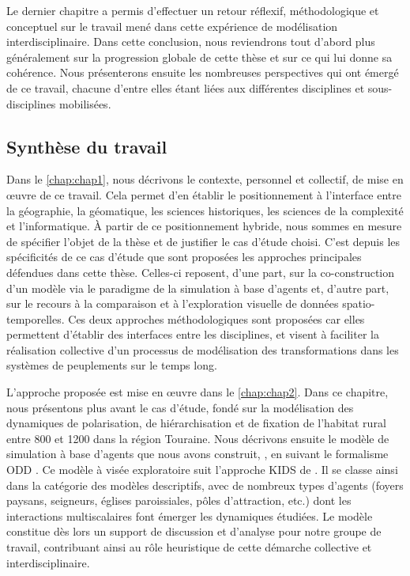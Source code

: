 Le dernier chapitre a permis d'effectuer un retour réflexif, méthodologique et conceptuel sur le travail mené dans cette expérience de modélisation interdisciplinaire.
Dans cette conclusion, nous reviendrons tout d'abord plus généralement sur la progression globale de cette thèse et sur ce qui lui donne sa cohérence.
Nous présenterons ensuite les nombreuses perspectives qui ont émergé de ce travail, chacune d'entre elles étant liées aux différentes disciplines et sous-disciplines mobilisées.


\subsection*{Synthèse du travail}

Dans le \cref{chap:chap1}, nous décrivons le contexte, personnel et collectif, de mise en œuvre de ce travail.
Cela permet d'en établir le positionnement à l'interface entre la géographie, la géomatique, les sciences historiques, les sciences de la complexité et l'informatique.
À partir de ce positionnement hybride, nous sommes en mesure de spécifier l'objet de la thèse et de justifier le cas d'étude choisi. C'est depuis les spécificités de ce cas d'étude que sont proposées les approches principales défendues dans cette thèse.
Celles-ci reposent, d'une part, sur la co-construction d'un modèle via le paradigme de la simulation à base d'agents et, d'autre part, sur le recours à la comparaison et à l'exploration visuelle de données spatio-temporelles.
Ces deux approches méthodologiques sont proposées car elles permettent d'établir des interfaces entre les disciplines, et visent à faciliter la réalisation collective d'un processus de modélisation des transformations dans les systèmes de peuplements sur le temps long. 

L'approche proposée est mise en œuvre dans le \cref{chap:chap2}.
Dans ce chapitre, nous présentons plus avant le cas d'étude, fondé sur la modélisation des dynamiques de polarisation, de hiérarchisation et de fixation de l'habitat rural entre 800 et 1200 dans la région Touraine.
Nous décrivons ensuite le modèle de simulation à base d'agents que nous avons construit, \simfeodal{}, en suivant le formalisme ODD \autocite{grimm_odd_2010}.
Ce modèle à visée exploratoire suit l'approche KIDS de \textcite{edmonds_kiss_2005}.
Il se classe ainsi dans la catégorie des modèles descriptifs, avec de nombreux types d'agents (foyers paysans, seigneurs, églises paroissiales, pôles d'attraction, etc.) dont les interactions multiscalaires font émerger les dynamiques étudiées.
Le modèle \simfeodal{} constitue dès lors un support de discussion et d'analyse pour notre groupe de travail, contribuant ainsi au rôle heuristique de cette démarche collective et interdisciplinaire.


